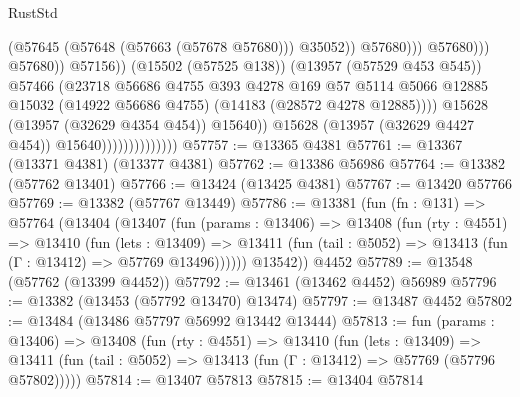 \begin{lexlean}{RustStd}
\begin{coremodule}
                                                            (@57645
                                                              (@57648 (@57663 (@57678 @57680)))
                                                              @35052))
                                                          @57680)))
                                                    @57680)))
                                              @57680))
                                          @57156))
                                      (@15502 (@57525 @138))
                                      (@13957 (@57529 @453 @545))
                                      @57466
                                      (@23718
                                        @56686
                                        @4755
                                        @393
                                        @4278
                                        @169
                                        @57
                                        @5114
                                        @5066
                                        @12885
                                        @15032
                                        (@14922 @56686 @4755)
                                        (@14183 (@28572 @4278 @12885))))
                                    @15628
                                    (@13957 (@32629 @4354 @454))
                                    @15640))
                                @15628
                                (@13957 (@32629 @4427 @454))
                                @15640))))))))))))))
@57757 := @13365 @4381
@57761 := @13367 (@13371 @4381) (@13377 @4381)
@57762 := @13386 @56986
@57764 := @13382 (@57762 @13401)
@57766 := @13424 (@13425 @4381)
@57767 := @13420 @57766
@57769 := @13382 (@57767 @13449)
@57786 := @13381
    (fun (fn : @131) =>
    @57764
      (@13404
        (@13407
          (fun (params : @13406) =>
          @13408
            (fun (rty : @4551) =>
            @13410
              (fun (lets : @13409) =>
              @13411 (fun (tail : @5052) => @13413 (fun (Γ : @13412) => @57769 @13496))))))
        @13542))
    @4452
@57789 := @13548 (@57762 (@13399 @4452))
@57792 := @13461 (@13462 @4452) @56989
@57796 := @13382 (@13453 (@57792 @13470) @13474)
@57797 := @13487 @4452
@57802 := @13484 (@13486 @57797 @56992 @13442 @13444)
@57813 := fun (params : @13406) =>
  @13408
    (fun (rty : @4551) =>
    @13410
      (fun (lets : @13409) =>
      @13411 (fun (tail : @5052) => @13413 (fun (Γ : @13412) => @57769 (@57796 @57802)))))
@57814 := @13407 @57813
@57815 := @13404 @57814

\end{coremodule}
\end{lexlean}
